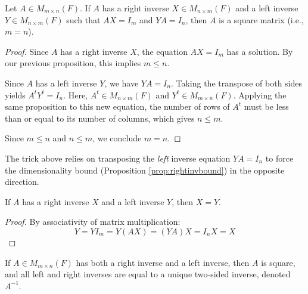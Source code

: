 \documentclass[../linear_algebra_and_groups.tex]{subfiles}
\begin{document}
\begin{corollary}
    \begin{shaded*}
        Let $A \in M_{m\times n}(F)$. If $A$ has a right inverse $X \in M_{n\times m}(F)$ and a left inverse $Y \in M_{n\times m}(F)$ such that $AX = I_m$ and $YA = I_n$, then $A$ is a square matrix (i.e., $m=n$).
    \end{shaded*}
\end{corollary}
\begin{proof}
    Since $A$ has a right inverse $X$, the equation $AX = I_m$ has a solution. By our previous proposition, this implies $m \le n$. 
    
    Since $A$ has a left inverse $Y$, we have $YA = I_n$. Taking the transpose of both sides yields $A^t Y^t = I_n$. Here, $A^t \in M_{n\times m}(F)$ and $Y^t \in M_{m\times n}(F)$. Applying the same proposition to this new equation, the number of rows of $A^t$ must be less than or equal to its number of columns, which gives $n \le m$. 
    
    Since $m \le n$ and $n \le m$, we conclude $m=n$.
    \qedhere
\end{proof}

\begin{remark}
    The trick above relies on transposing the \textit{left} inverse equation $YA = I_n$ to force the dimensionality bound (Proposition \ref{prop:rightinvbound}) in the opposite direction.
\end{remark}

\begin{lemma}
    \begin{shaded*}
        If $A$ has a right inverse $X$ and a left inverse $Y$, then $X=Y$.
    \end{shaded*}
\end{lemma}
\begin{proof}
    By associativity of matrix multiplication:
    \[ Y = Y I_m = Y (A X) = (Y A) X = I_n X = X \]
    \qedhere
\end{proof}

\begin{corollary}
    \begin{shaded*}
        If $A\in M_{m\times n}(F)$ has both a right inverse and a left inverse, then $A$ is square, and all left and right inverses are equal to a unique two-sided inverse, denoted $A^{-1}$.
    \end{shaded*}
\end{corollary}
\end{document}
